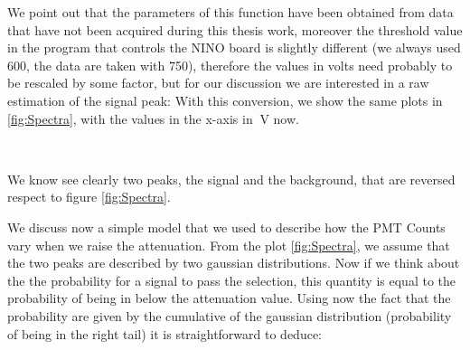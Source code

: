 We point out that the parameters of this function have been obtained from data that have not been acquired during this thesis work, moreover the threshold value in the program that controls the NINO board is slightly different (we always used 600, the data are taken with 750), therefore the values in volts need probably to be rescaled by some factor, but for our discussion we are interested in a raw estimation of the signal peak:
With this conversion, we show the same plots in \ref{fig:Spectra}, with the values in the x-axis in $\SI{}{\volt}$ now.

\begin{figure}[!ht]
\centering
{}
\\
\end{figure}

We know see clearly two peaks, the signal and the background, that are reversed respect to figure \ref{fig:Spectra}.

We discuss now a simple model that we used to describe how the PMT Counts vary when we raise the attenuation. From the plot \ref{fig:Spectra}, we assume that the two peaks are described by two gaussian distributions. Now if we think about the the probability for a signal to pass the selection, this quantity is equal to the probability of being in below the attenuation value. Using now the fact that the probability are given by the cumulative of the gaussian distribution (probability of being in the right tail) it is straightforward to deduce:

